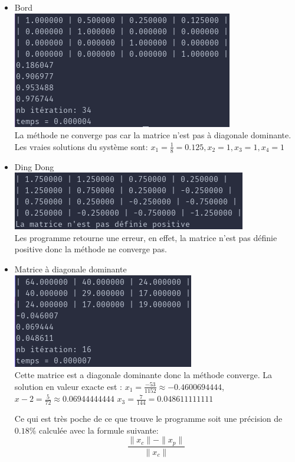 \documentclass[a4paper]{article}
\begin{document}
\begin{itemize}
\item Bord \\
  \includegraphics[scale=0.5]{./img/cholesky/bord.png} \\
  La méthode ne converge pas car la matrice n'est pas à diagonale dominante. Les
  vraies solutions du système sont:
  $x_{1} = \frac{1}{8} = 0.125 , x_{2} = 1 , x_{3} = 1 , x_{4} = 1$
\item Ding Dong \\
  \includegraphics[scale=0.5]{./img/cholesky/ding_dong.png} \\
  Les programme retourne une erreur, en effet, la matrice n'est pas définie
  positive donc la méthode ne converge pas.
\item Matrice à diagonale dominante \\
  \includegraphics[scale=0.5]{./img/cholesky/chocho_test_final.png} \\
  Cette matrice est a diagonale dominante donc la méthode converge. La solution
  en valeur exacte est :
  \quad$x_{1} = \frac{-53}{1152} \approx -0.4600694444$,
  \quad$x-{2} = \frac{5}{72} \approx 0.06944444444$
  \quad$x_{3} = \frac{7}{144} = 0.048611111111$
  
  Ce qui est très poche de ce que trouve le programme soit une
  précision de $0.18\%$ calculée avec la formule suivante:
  \[\frac{\parallel x_{c} \parallel - \parallel x_{p} \parallel}{\parallel x_{c}
    \parallel}\]
  

\end{itemize}
\end{document}
